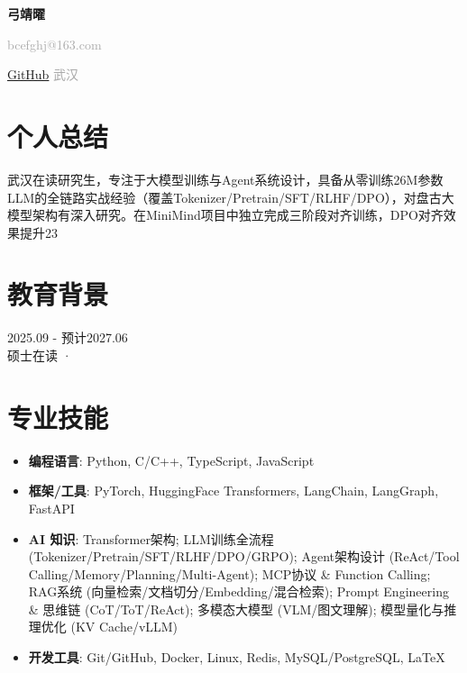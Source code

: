 \documentclass[11pt,a4paper]{article}
\begin{document}
\begin{center}
  {\Huge\bfseries 弓靖曜}\\[6pt]
  \textcolor{darkgray}{
    bcefghj@163.com \quad
    
    \href{https://github.com/bcefghj}{GitHub} \quad
    武汉
  }
\end{center}

\vspace{-4pt}

\section{个人总结}
武汉在读研究生，专注于大模型训练与Agent系统设计，具备从零训练26M参数LLM的全链路实战经验（覆盖Tokenizer/Pretrain/SFT/RLHF/DPO），对盘古大模型架构有深入研究。在MiniMind项目中独立完成三阶段对齐训练，DPO对齐效果提升23%


\section{教育背景}

\noindent\textbf{} \hfill 2025.09 - 预计2027.06 \\
硕士在读 ·  




\section{专业技能}
\begin{itemize}
  \item \textbf{编程语言}: Python, C/C++, TypeScript, JavaScript
  \item \textbf{框架/工具}: PyTorch, HuggingFace Transformers, LangChain, LangGraph, FastAPI
  \item \textbf{AI 知识}: Transformer架构; LLM训练全流程 (Tokenizer/Pretrain/SFT/RLHF/DPO/GRPO); Agent架构设计 (ReAct/Tool Calling/Memory/Planning/Multi-Agent); MCP协议 & Function Calling; RAG系统 (向量检索/文档切分/Embedding/混合检索); Prompt Engineering & 思维链 (CoT/ToT/ReAct); 多模态大模型 (VLM/图文理解); 模型量化与推理优化 (KV Cache/vLLM)
  \item \textbf{开发工具}: Git/GitHub, Docker, Linux, Redis, MySQL/PostgreSQL, LaTeX
\end{itemize}
\end{document}
